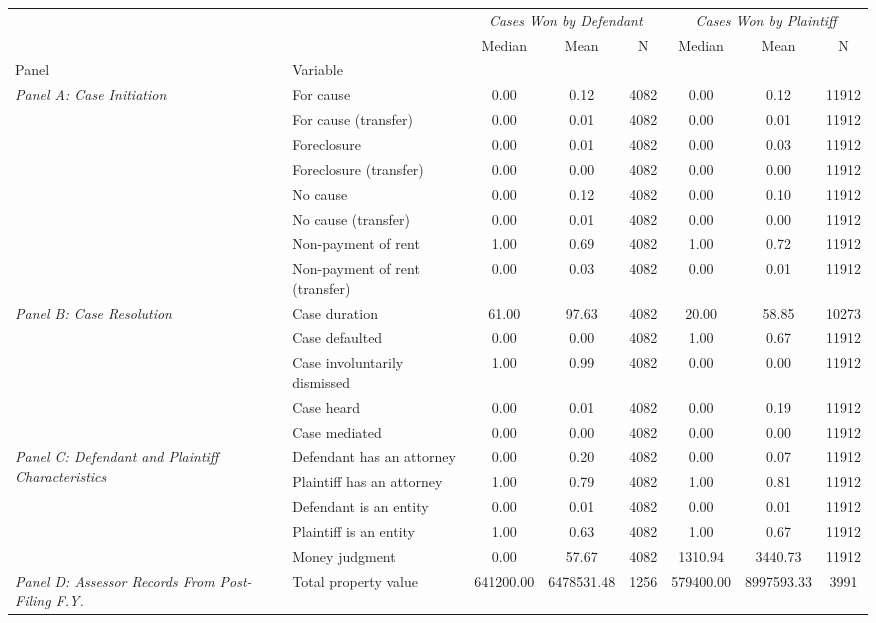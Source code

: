 \begin{tabular}{llcccccc}
\toprule
 &  & \multicolumn{3}{c}{\textit{Cases Won by Defendant}} & \multicolumn{3}{c}{\textit{Cases Won by Plaintiff}} \\ \cline{2-5}
 &  & Median & Mean & N & Median & Mean & N \\
Panel & Variable &  &  &  &  &  &  \\
\midrule
\multirow[c]{8}{4cm}{\textit{Panel A: Case Initiation}} & For cause & 0.00 & 0.12 & 4082 & 0.00 & 0.12 & 11912 \\
 & For cause (transfer) & 0.00 & 0.01 & 4082 & 0.00 & 0.01 & 11912 \\
 & Foreclosure & 0.00 & 0.01 & 4082 & 0.00 & 0.03 & 11912 \\
 & Foreclosure (transfer) & 0.00 & 0.00 & 4082 & 0.00 & 0.00 & 11912 \\
 & No cause & 0.00 & 0.12 & 4082 & 0.00 & 0.10 & 11912 \\
 & No cause (transfer) & 0.00 & 0.01 & 4082 & 0.00 & 0.00 & 11912 \\
 & Non-payment of rent & 1.00 & 0.69 & 4082 & 1.00 & 0.72 & 11912 \\
 & Non-payment of rent (transfer) & 0.00 & 0.03 & 4082 & 0.00 & 0.01 & 11912 \\
\cline{1-8}
\multirow[c]{5}{4cm}{\textit{Panel B: Case Resolution}} & Case duration & 61.00 & 97.63 & 4082 & 20.00 & 58.85 & 10273 \\
 & Case defaulted & 0.00 & 0.00 & 4082 & 1.00 & 0.67 & 11912 \\
 & Case involuntarily dismissed & 1.00 & 0.99 & 4082 & 0.00 & 0.00 & 11912 \\
 & Case heard & 0.00 & 0.01 & 4082 & 0.00 & 0.19 & 11912 \\
 & Case mediated & 0.00 & 0.00 & 4082 & 0.00 & 0.00 & 11912 \\
\cline{1-8}
\multirow[c]{5}{4cm}{\textit{Panel C: Defendant and Plaintiff Characteristics}} & Defendant has an attorney & 0.00 & 0.20 & 4082 & 0.00 & 0.07 & 11912 \\
 & Plaintiff has an attorney & 1.00 & 0.79 & 4082 & 1.00 & 0.81 & 11912 \\
 & Defendant is an entity & 0.00 & 0.01 & 4082 & 0.00 & 0.01 & 11912 \\
 & Plaintiff is an entity & 1.00 & 0.63 & 4082 & 1.00 & 0.67 & 11912 \\
 & Money judgment & 0.00 & 57.67 & 4082 & 1310.94 & 3440.73 & 11912 \\
\cline{1-8}
\multirow[c]{5}{4cm}{\textit{Panel D: Assessor Records From Post-Filing F.Y.}} & Total property value & 641200.00 & 6478531.48 & 1256 & 579400.00 & 8997593.33 & 3991 \\

\end{tabular}
